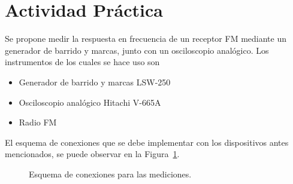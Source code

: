   \pagebreak
  \section{Actividad Práctica}
    Se propone medir la respuesta en frecuencia de un receptor FM mediante un generador de barrido y marcas, junto
    con un osciloscopio analógico. Los instrumentos de los cuales se hace uso son

    \begin{itemize}
      \item Generador de barrido y marcas LSW-250
      \item Osciloscopio analógico Hitachi V-665A
      \item Radio FM
    \end{itemize}
    
    El esquema de conexiones que se debe implementar con los dispositivos antes mencionados, se puede observar en
    la Figura~\ref{fig:EsquemaConexiones}.

    \begin{figure}[H]
      \centering
      \caption{Esquema de conexiones para las mediciones.}
      \label{fig:EsquemaConexiones}
    \end{figure}
    
    
    
    
    
